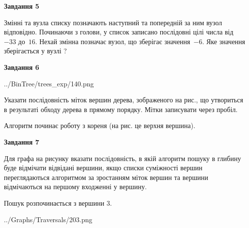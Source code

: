 \documentclass[12pt, ukrainian]{article}
\begin{document}
{\begin {large}
{\begin {center}\textbf{Завдання 5}\end {center}}\par
Змінні  та  вузла списку позначають наступний та попередній за ним вузол відповідно. Починаючи з голови, у список записано послідовні цілі числа від~$-33$ до~$16$. Нехай змінна  позначає вузол, що зберігає значення~$-6$.
Яке значення зберігається у вузлі  ?\par
\newpage

{\begin {center}\textbf{Завдання 6}\end {center}}\par

\begin{center}
	{../BinTree/trees_exp/140.png}
\end{center}
Указати послідовність міток вершин дерева, зображеного на рис., що утвориться в результаті обходу дерева в прямому порядку. Мітки записувати через пробіл.\par Алгоритм починає роботу з кореня (на рис. це верхня вершина).\par
\newpage

{\begin {center}\textbf{Завдання 7}\end {center}}\par
Для графа на рисунку вказати послідовність, в якій алгоритм пошуку в глибину буде відмічати відвідані вершини, якщо списки суміжності вершин переглядаються алгоритмом за зростанням міток вершин та вершини відмічаються на першому вход\-женні у вершину.\par
Пошук розпочинається з вершини 3.\par

\begin{center}
	{../Graphs/Traversals/203.png}
\end{center}\par
\newpage


\end{large}}
\end{document}
